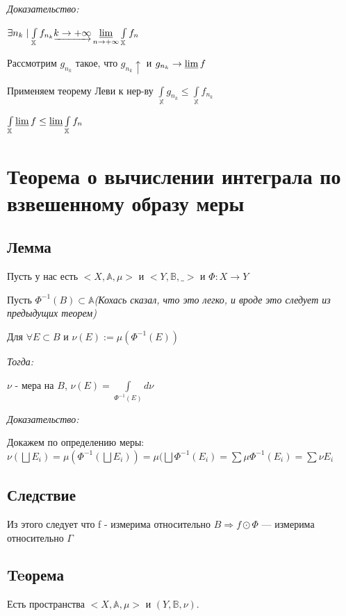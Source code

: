 \documentclass[paper=a4, fontsize=17pt]{article}
\begin{document}
\emph{Доказательство:}

$ \exists n_k \mid \int\limits_{\mathbb{X}} f_{n_k} \underrightarrow{k \rightarrow +\infty}
\varliminf\limits_{n \rightarrow +\infty} \int\limits_{\mathbb{X}} f_n $

Рассмотрим $ g_{n_k} $ такое, что $ g_{n_k} \uparrow $ и $ g_{n_k} \rightarrow \varliminf f $

Применяем теорему Леви к нер-ву $ \int\limits_{\mathbb{X}} g_{n_k} \leq \int\limits_{\mathbb{X}} f_{n_k}$

$ \int\limits_{\mathbb{X}} \varliminf f \leq \varliminf \int\limits_{\mathbb{X}} f_n $

\section{Теорема о вычислении интеграла по взвешенному образу меры}
	\subsection{Лемма}
		Пусть у нас есть $<X, \mathbb{A}, \mu>$ и $<Y, \mathbb{B}, \_>$ и $\Phi: X\rightarrow Y$

		Пусть  $\Phi^{-1}(B) \subset \mathbb{A}$\textit{(Кохась сказал, что это легко, и вроде это следует из предыдущих теорем)}

		Для $\forall E \subset B$ и $\nu(E):=\mu(\Phi^{-1}(E))$

		\emph{Тогда:}

		 $\nu$ - мера на $B$, $\nu(E) = \int\limits_{\Phi^{-1}(E)}d\nu$

		\emph{Доказательство:}

			Докажем по определению меры: \\

			$\nu(\bigsqcup E_i) = \mu(\Phi^{-1}(\bigsqcup E_i)) = \mu(\bigsqcup \Phi^{-1}(E_i) = \sum \mu \Phi^{-1}(E_i) = \sum \nu E_i$

	\subsection{Следствие}
	Из этого следует что f - измерима относительно $B \Rightarrow f\odot \Phi $ --- измерима относительно $\Gamma$

	\subsection {Teорема}
		Есть пространства $<X, \mathbb{A}, \mu>$ и $(Y, \mathbb{B}, \nu)$.
\end{document}
